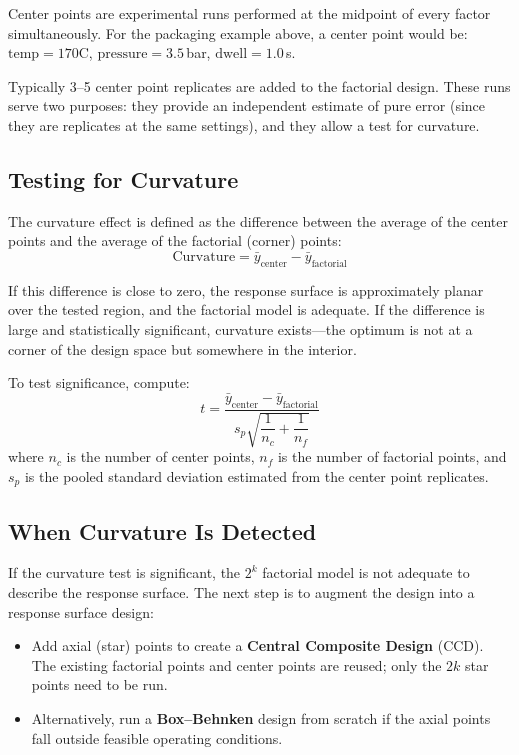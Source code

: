 \documentclass[11pt]{book}
\begin{document}
Center points are experimental runs performed at the midpoint of every factor
simultaneously. For the packaging example above, a center point would be:
$\text{temp} = 170$\textdegree C, $\text{pressure} = 3.5$\,bar,
$\text{dwell} = 1.0$\,s.

Typically 3--5 center point replicates are added to the factorial design. These
runs serve two purposes: they provide an independent estimate of pure error
(since they are replicates at the same settings), and they allow a test for
curvature.

\subsection{Testing for Curvature}

The curvature effect is defined as the difference between the average of the
center points and the average of the factorial (corner) points:
\[
\text{Curvature} = \bar{y}_{\text{center}} - \bar{y}_{\text{factorial}}
\]

If this difference is close to zero, the response surface is approximately
planar over the tested region, and the factorial model is adequate. If the
difference is large and statistically significant, curvature exists---the
optimum is not at a corner of the design space but somewhere in the interior.

To test significance, compute:
\[
t = \frac{\bar{y}_{\text{center}} - \bar{y}_{\text{factorial}}}
{s_p \sqrt{\dfrac{1}{n_c} + \dfrac{1}{n_f}}}
\]
where $n_c$ is the number of center points, $n_f$ is the number of factorial
points, and $s_p$ is the pooled standard deviation estimated from the center
point replicates.

\subsection{When Curvature Is Detected}

If the curvature test is significant, the $2^k$ factorial model is not adequate
to describe the response surface. The next step is to augment the design into a
response surface design:

\begin{itemize}[nosep]
\item Add axial (star) points to create a \textbf{Central Composite Design}
      (CCD). The existing factorial points and center points are reused; only the
      $2k$ star points need to be run.
\item Alternatively, run a \textbf{Box--Behnken} design from scratch if the
      axial points fall outside feasible operating conditions.
\end{itemize}
\end{document}
